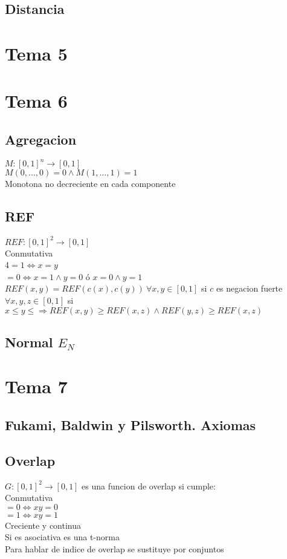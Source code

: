 \documentclass[paper=a4, fontsize=11pt]{scrartcl} %
\begin{document}
\subsection{Distancia}
\section{Tema 5}
\section{Tema 6}
\subsection{Agregacion}
$M:[0,1]^n\rightarrow[0,1]$\\
$M(0,...,0) = 0 \land M(1,...,1)=1$\\
Monotona no decreciente en cada componente
\subsection{REF}
$REF:[0,1]^2\rightarrow[0,1]$\\
Conmutativa\\4$=1\iff x=y$\\$ =0 \iff x=1\land y=0$ ó $x=0\land y=1$\\$REF(x,y)=REF(c(x),c(y))\ \forall x,y\in [0,1]$ si $c$ es negacion fuerte\\$\forall x,y,z\in[0,1]$ si $x\leq y \leq \Rightarrow REF(x,y)\geq REF(x,z) \land REF(y,z)\geq REF(x,z)$
\subsection{Normal $E_N$}
\section{Tema 7}
\subsection{Fukami, Baldwin y Pilsworth. Axiomas}
\subsection{Overlap}
$G:[0,1]^2\rightarrow[0,1]$ es una funcion de overlap si cumple:\\
Conmutativa\\$=0\iff xy=0$\\$=1\iff xy=1$\\Creciente y continua\\Si es asociativa es una t-norma\\
Para hablar de indice de overlap se sustituye por conjuntos
\end{document}
